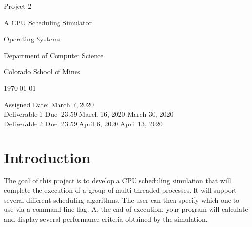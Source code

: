 \documentclass[10pt]{article}
\begin{document}
\thispagestyle{empty}
\begin{titlepage}
    \centering
    {\Huge Project 2 \par \vspace{0.5cm}}
    {\Large A CPU Scheduling Simulator \par}
    {\normalsize   \par}

    \vfill
    {\normalsize Operating Systems \par}
    {\normalsize Department of Computer Science \par}
    {\normalsize Colorado School of Mines \par}
    {\normalsize \today \par}
    \thispagestyle{empty}
    \thispagestyle{empty}
\end{titlepage}

\clearpage
\pagestyle{fancy}

\newcommand{\assigndate}{March 7, 2020}
\newcommand{\donedate}{23:59 \sout{March 16, 2020} March 30, 2020}
\newcommand{\dtwodate}{23:59 \sout{April 6, 2020} April 13, 2020}
\newcommand{\dthreedate}{23:59 March 30, 2020}


\begin{center}
{\large Assigned Date: \assigndate} \\ \vspace{0.35em}
{\Large Deliverable 1 Due: \donedate} \\ \vspace{0.325em}
{\Large Deliverable 2 Due: \dtwodate}
\end{center}

\section*{Introduction}
The goal of this project is to develop a CPU scheduling simulation that will complete the execution of a
group of multi-threaded processes. It will support several different scheduling algorithms. The
user can then specify which one to use via a command-line flag. At the end of execution, your program will calculate and
display several performance criteria obtained by the simulation.
\end{document}
